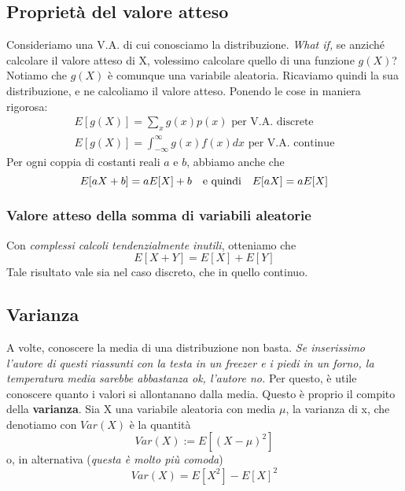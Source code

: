 \documentclass[11pt]{article}
\begin{document}
\subsection{Proprietà del valore atteso}
Consideriamo una V.A. di cui conosciamo la distribuzione. \textit{What if, }se anziché calcolare il valore atteso di X, volessimo calcolare quello di una funzione $g(X)$? Notiamo che $g(X)$ è comunque una variabile aleatoria. Ricaviamo quindi la sua distribuzione, e ne calcoliamo il valore atteso. Ponendo le cose in maniera rigorosa:
\begin{gather*}
E[g(X)] = \sum_x g(x)p(x)\mbox{ per V.A. discrete}\\ 
E[g(X)] =\int_{-\infty}^\infty g(x)f(x)dx\mbox{ per V.A. continue}
\end{gather*}
Per ogni coppia di costanti reali $a$ e $b$, abbiamo anche che
\begin{displaymath}
    E[aX+b] = aE[X]+b\hspace{10px}\mbox{e quindi}\hspace{10px}E[aX]=aE[X]
\end{displaymath}
\subsubsection{Valore atteso della somma di variabili aleatorie}
Con \textit{complessi calcoli tendenzialmente inutili}, otteniamo che 
\begin{displaymath}
    E[X+Y] = E[X] + E[Y]
\end{displaymath}
Tale risultato vale sia nel caso discreto, che in quello continuo.
\subsection{Varianza}
A volte, conoscere la media di una distribuzione non basta. \textit{Se inserissimo l'autore di questi riassunti con la testa in un freezer e i piedi in un forno, la temperatura media sarebbe abbastanza ok, l'autore no.} Per questo, è utile conoscere quanto i valori si allontanano dalla media. Questo è proprio il compito della \textbf{varianza}. Sia X una variabile aleatoria con media $\mu$, la varianza di x, che denotiamo con $Var(X)$ è la quantità
\begin{displaymath}
    Var(X):=E[(X-\mu)^2]
\end{displaymath}
o, in alternativa (\textit{questa è molto più comoda})
\begin{displaymath}
    Var(X) = E[X^2]-E[X]^2
\end{displaymath}
\end{document}
